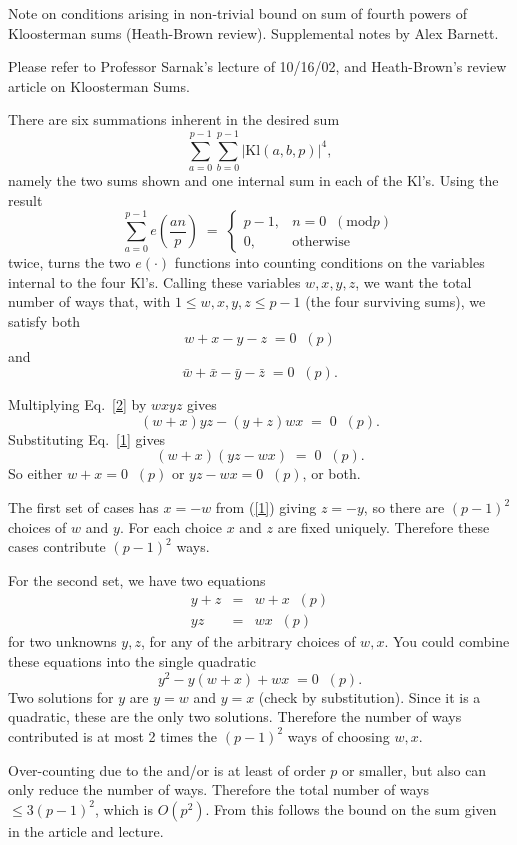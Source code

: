 \documentclass[12pt,letterpaper]{report}
\newcommand\be{\begin{equation}}
\newcommand\ee{\end{equation}}
\newcommand\bea{\begin{eqnarray}}
\newcommand\eea{\end{eqnarray}}
\begin{document}
Note on conditions arising in non-trivial bound on sum of fourth
powers of Kloosterman sums (Heath-Brown review). Supplemental
notes by Alex Barnett.


Please refer to Professor Sarnak's lecture of 10/16/02, and
Heath-Brown's review article on Kloosterman Sums.

There are six summations inherent in the desired sum \be
\sum_{a=0}^{p-1} \sum_{b=0}^{p-1} \left| \mbox{Kl} (a,b,p)
\right|^4 , \ee namely the two sums shown and one internal sum in
each of the Kl's. Using the result \be \sum_{a=0}^{p-1}
e\left(\frac{an}{p}\right) \; = \; \left\{\begin{array}{ll}
p-1, & n=0\;\; (\mbox{mod} p)\\
0, & \mbox{otherwise}
\end{array}\right.
\ee twice, turns the two $e(\cdot)$ functions into counting
conditions on the variables internal to the four Kl's. Calling
these variables $w,x,y,z$, we want the total number of ways that,
with $1 \le w,x,y,z \le p-1$ (the four surviving sums), we satisfy
both \be \label{1}
    w + x - y -z \; = 0 \;\;(p)
\ee and \be \label{2}
    \bar{w} + \bar{x} - \bar{y} -\bar{z} \; = 0 \;\; (p) .
\ee

Multiplying Eq.~\ref{2} by $wxyz$ gives \be (w+x)yz - (y+z)wx \; =
\; 0 \;\;(p). \ee Substituting Eq.~\ref{1} gives \be (w+x)(yz -
wx) \; = \; 0 \;\;(p). \ee So either $w+x = 0 \;\; (p)$ or $yz -
wx = 0 \;\; (p)$, or both.

The first set of cases has $x=-w$ from (\ref{1}) giving $z=-y$, so
there are $(p-1)^2$ choices of $w$ and $y$. For each choice $x$
and $z$ are fixed uniquely. Therefore these cases contribute
$(p-1)^2$ ways.

For the second set, we have two equations \bea
y + z &= &w + x \;\; (p) \\
yz &= &wx \;\; (p) \eea for two unknowns $y,z$, for any of the
arbitrary choices of $w,x$. You could combine these equations into
the single quadratic \be y^2 - y(w+x) + wx \; = 0 \;\; (p). \ee
Two solutions for $y$ are $y=w$ and $y=x$ (check by substitution).
Since it is a quadratic, these are the only two solutions.
Therefore the number of ways contributed is at most 2 times the
$(p-1)^2$ ways of choosing $w,x$.

Over-counting due to the and/or is at least of order $p$ or
smaller, but also can only reduce the number of ways. Therefore
the total number of ways $\le 3(p-1)^2$, which is $O(p^2)$. From
this follows the bound on the sum given in the article and
lecture.
\end{document}
